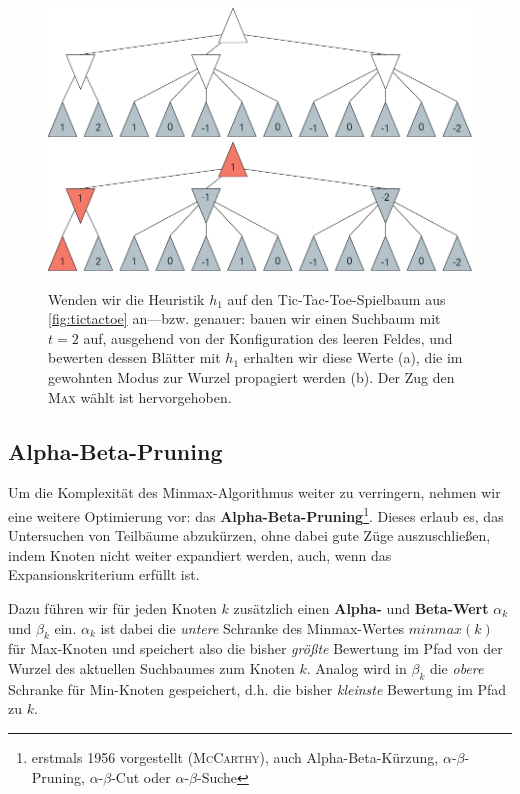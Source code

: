 \documentclass[a4paper,twoside]{scrartcl}
\newcommand\q[1]{\glqq #1\grqq}
\begin{document}
\begin{figure}[!ht]
  \label{fig:heuristic}
  \centering
  \includegraphics[width=.8\textwidth]{minmax_heuristik.pdf}
  \\ \vspace{\baselineskip}
  \includegraphics[width=.8\textwidth]{minmax_heuristik_2.pdf}
  \caption{Wenden wir die Heuristik $h_1$ auf den Tic-Tac-Toe-Spielbaum aus \ref{fig:tictactoe} an---bzw. genauer: bauen wir einen Suchbaum mit $t = 2$ auf, ausgehend von der Konfiguration des leeren Feldes, und bewerten dessen Blätter mit $h_1$ erhalten wir diese Werte (a), die im gewohnten Modus zur Wurzel propagiert werden (b). Der Zug den \textsc{Max} wählt ist hervorgehoben.}
\end{figure}


\subsection{Alpha-Beta-Pruning}

Um die Komplexität des Minmax-Algorithmus weiter zu verringern, nehmen wir eine weitere Optimierung vor: das \textbf{Alpha-Beta-Pruning}\footnote{erstmals 1956 vorgestellt (\textsc{McCarthy}), auch \q{Alpha-Beta-Kürzung}, \q{$\alpha$-$\beta$-Pruning}, \q{$\alpha$-$\beta$-Cut} oder \q{$\alpha$-$\beta$-Suche}}. Dieses erlaub es, das Untersuchen von Teilbäume abzukürzen, ohne dabei gute Züge auszuschließen, indem Knoten nicht weiter expandiert werden, auch, wenn das Expansionskriterium erfüllt ist. 

Dazu führen wir für jeden Knoten $k$ zusätzlich einen \textbf{Alpha-} und \textbf{Beta-Wert} $\alpha_k$ und $\beta_k$ ein. $\alpha_k$ ist dabei die \textit{untere} Schranke des Minmax-Wertes $minmax(k)$ für Max-Knoten und speichert also die bisher \textit{größte} Bewertung im Pfad von der Wurzel des aktuellen Suchbaumes zum Knoten $k$. Analog wird in $\beta_k$ die \textit{obere} Schranke für Min-Knoten gespeichert, d.h. die bisher \textit{kleinste} Bewertung im Pfad zu $k$.
\end{document}
